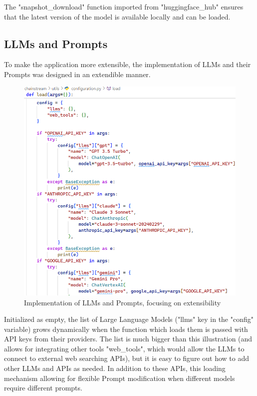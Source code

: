 The "snapshot\_download" function imported from "huggingface\_hub" ensures that the latest version of the model is available locally and can be loaded.

\subsection{LLMs and Prompts}
To make the application more extensible, the implementation of LLMs and their Prompts was designed in an extendible manner.
\begin{figure}[htbp]
    \centering
    \includegraphics[width=\linewidth]{./figures/llms-implementation.png}
    \caption{Implementation of LLMs and Prompts, focusing on extensibility}
\end{figure}\newline
Initialized as empty, the list of Large Language Models ("llms" key in the "config" variable) grows dynamically when the function which loads them is passed with API keys from their providers.\newline
The list is much bigger than this illustration (and allows for integrating other tools "web\_tools", which would allow the LLMs to connect to external web searching APIs), but it is easy to figure out how to add other LLMs and APIs as needed.\newline
In addition to these APIs, this loading mechanism allowing for flexible Prompt modification when different models require different prompts.
